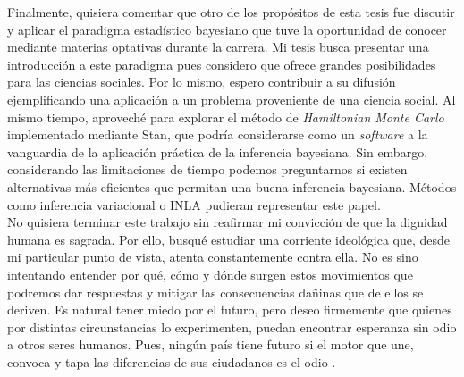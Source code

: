 Finalmente, quisiera comentar que otro de los propósitos de esta tesis fue discutir y aplicar el paradigma estadístico bayesiano que tuve la oportunidad de conocer mediante materias optativas durante la carrera. Mi tesis busca presentar una introducción a este paradigma pues considero que ofrece grandes posibilidades para las ciencias sociales. Por lo mismo, espero contribuir a su difusión ejemplificando una aplicación a un problema proveniente de una ciencia social. Al mismo tiempo, aproveché para explorar el método de \textit{Hamiltonian Monte Carlo} implementado mediante Stan, que podría considerarse como un \textit{software} a la vanguardia de la aplicación práctica de la inferencia bayesiana. Sin embargo, considerando las limitaciones de tiempo podemos preguntarnos si existen alternativas más eficientes que permitan una buena inferencia bayesiana. Métodos como inferencia variacional o INLA pudieran representar este papel.\\

No quisiera terminar este trabajo sin reafirmar mi convicción de que la dignidad humana es sagrada. Por ello, busqué estudiar una corriente ideológica que, desde mi particular punto de vista, atenta constantemente contra ella. No es sino intentando entender por qué, cómo y dónde surgen estos movimientos que podremos dar respuestas y mitigar las consecuencias dañinas que de ellos se deriven. Es natural tener miedo por el futuro, pero deseo firmemente que quienes por distintas circunstancias lo experimenten, puedan encontrar esperanza sin odio a otros seres humanos. Pues, ningún país tiene futuro si el motor que une, convoca y tapa las diferencias de sus ciudadanos es el odio \parencite{Francisco}.
 
 
